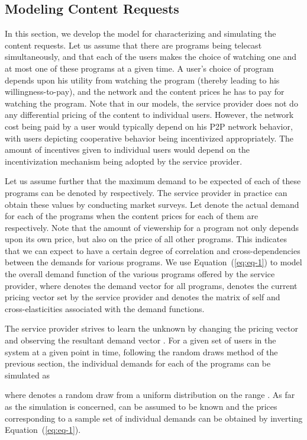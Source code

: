 \documentclass[conference,a4paper]{IEEEtran}
\begin{document}
\subsection{Modeling Content Requests}
\label{sec:model-cont-requ}
In this section, we develop the model for characterizing and simulating the content requests. Let us assume that there are  programs being telecast simultaneously, and that each of the users makes the choice of watching one and at most one of these programs at a given time. A user's choice of program depends upon his utility from watching the program (thereby leading to his willingness-to-pay), and the network and the content prices he has to pay for watching the program. Note that in our models, the service provider does not do any differential pricing of the content to individual users. However, the network cost being paid by a user would typically depend on his P2P network behavior, with users depicting cooperative behavior being incentivized appropriately. The amount of incentives given to individual users would depend on the incentivization mechanism being adopted by the service provider.

Let us assume further that the maximum demand to be expected of each of these  programs can be denoted by  respectively. The service provider in practice can obtain these values by conducting market surveys. Let  denote the actual demand for each of the programs when the content prices for each of them are  respectively. Note that the amount of viewership for a program not only depends upon its own price, but also on the price of all other programs. This indicates that we can expect to have a certain degree of correlation and cross-dependencies between the demands for various programs. We use Equation~(\ref{eq:eq-1}) to model the overall demand function of the various programs offered by the service provider, where  denotes the demand vector for all programs,  denotes the current pricing vector set by the service provider and  denotes the matrix of self and cross-elasticities associated with the demand functions.

The service provider strives to learn the unknown  by changing the pricing vector  and observing the resultant demand vector . For a given set of  users in the system at a given point in time, following the random draws method of the previous section, the individual demands for each of the programs can be simulated as 

where  denotes a random draw from a uniform distribution on the range . As far as the simulation is concerned,  can be assumed to be known and the prices corresponding to a sample set of individual demands can be obtained by inverting Equation~(\ref{eq:eq-1}).
\end{document}
